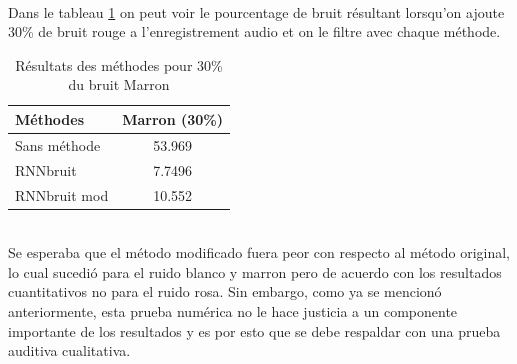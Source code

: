 \documentclass[conference,onecolumn]{IEEEtran}
\begin{document}
\hfill \\
Dans le tableau \ref{table:t15} on peut voir le pourcentage de bruit résultant lorsqu’on ajoute 30\% de bruit rouge a l’enregistrement audio et on le filtre avec chaque méthode.
\begin{table}[hbt!]
    \centering
    \begin{tabular}{ l  c }
    \textbf{Méthodes} & \textbf{Marron (30\%)} \\
    \hline
    Sans méthode & 53.969 \\
    RNNbruit & 7.7496 \\
    RNNbruit mod & 10.552 \\
    \end{tabular}
    \caption{Résultats des méthodes pour 30\% du bruit Marron}
    \label{table:t15}
\end{table}
\hfill \\

Se esperaba que el método modificado fuera peor con respecto al método original, lo cual sucedió para el ruido blanco y marron pero de acuerdo con los resultados cuantitativos no para el ruido rosa. Sin embargo, como ya se mencionó anteriormente, esta prueba numérica no le hace justicia a un componente importante de los resultados y es por esto que se debe respaldar con una prueba auditiva cualitativa.
\end{document}

